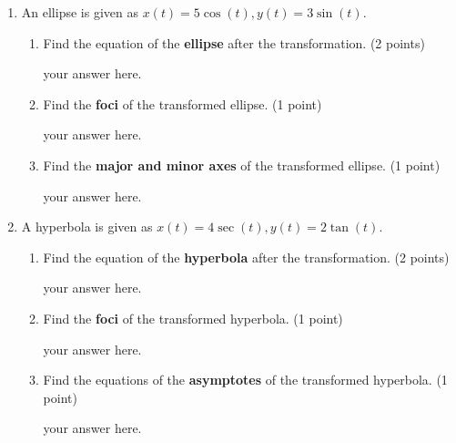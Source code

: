 \begin{enumerate}
\begin{enumerate}
    \item An ellipse is given as $x(t)=5\cos(t), y(t)=3\sin(t)$.
    \begin{enumerate}
      \item Find the equation of the \textbf{ellipse} after the transformation. (2 points)
      \begin{subanswer}
        your answer here.
      \end{subanswer}
      \item Find the \textbf{foci} of the transformed ellipse. (1 point)
      \begin{subanswer}
        your answer here.
      \end{subanswer}
      \item Find the \textbf{major and minor axes} of the transformed ellipse. (1 point)
      \begin{subanswer}
        your answer here.
      \end{subanswer}
    \end{enumerate}

    \item A hyperbola is given as $x(t)=4\sec(t), y(t)=2\tan(t)$.
    \begin{enumerate}
      \item Find the equation of the \textbf{hyperbola} after the transformation. (2 points)
      \begin{subanswer}
        your answer here.
      \end{subanswer}
      \item Find the \textbf{foci} of the transformed hyperbola. (1 point)
      \begin{subanswer}
        your answer here.
      \end{subanswer}
      \item Find the equations of the \textbf{asymptotes} of the transformed hyperbola. (1 point)
      \begin{subanswer}
        your answer here.
      \end{subanswer}
    \end{enumerate}
  \end{enumerate}





\end{enumerate}
